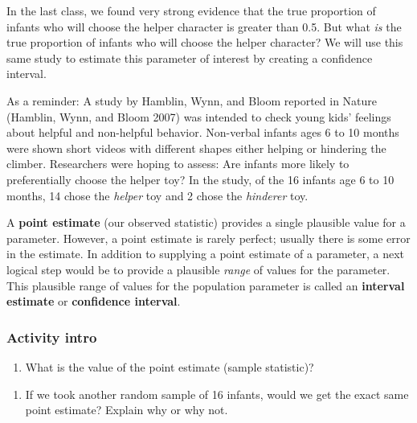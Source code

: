 \documentclass[
]{report}
\providecommand{\tightlist}{%
  \setlength{\itemsep}{0pt}\setlength{\parskip}{0pt}}
\begin{document}
In the last class, we found very strong evidence that the true proportion of infants who will choose the helper character is greater than 0.5. But what \emph{is} the true proportion of infants who will choose the helper character? We will use this same study to estimate this parameter of interest by creating a confidence interval.

As a reminder: A study by Hamblin, Wynn, and Bloom reported in Nature (Hamblin, Wynn, and Bloom 2007) was intended to check young kids' feelings about helpful and non-helpful behavior. Non-verbal infants ages 6 to 10 months were shown short videos with different shapes either helping or hindering the climber. Researchers were hoping to assess: Are infants more likely to preferentially choose the helper toy? In the study, of the 16 infants age 6 to 10 months, 14 chose the \emph{helper} toy and 2 chose the \emph{hinderer} toy.

A \textbf{point estimate} (our observed statistic) provides a single plausible value for a parameter. However, a point estimate is rarely perfect; usually there is some error in the estimate. In addition to supplying a point estimate of a parameter, a next logical step would be to provide a plausible \emph{range} of values for the parameter. This plausible range of values for the population parameter is called an \textbf{interval estimate} or \textbf{confidence interval}.

\subsubsection*{Activity intro}\label{activity-intro}

\begin{enumerate}
\def\labelenumi{\arabic{enumi}.}
\tightlist
\item
  What is the value of the point estimate (sample statistic)?
\end{enumerate}

\vspace{0.3in}

\begin{enumerate}
\def\labelenumi{\arabic{enumi}.}
\setcounter{enumi}{1}
\tightlist
\item
  If we took another random sample of 16 infants, would we get the exact same point estimate? Explain why or why not.
\end{enumerate}

\vspace{0.5in}
\end{document}
